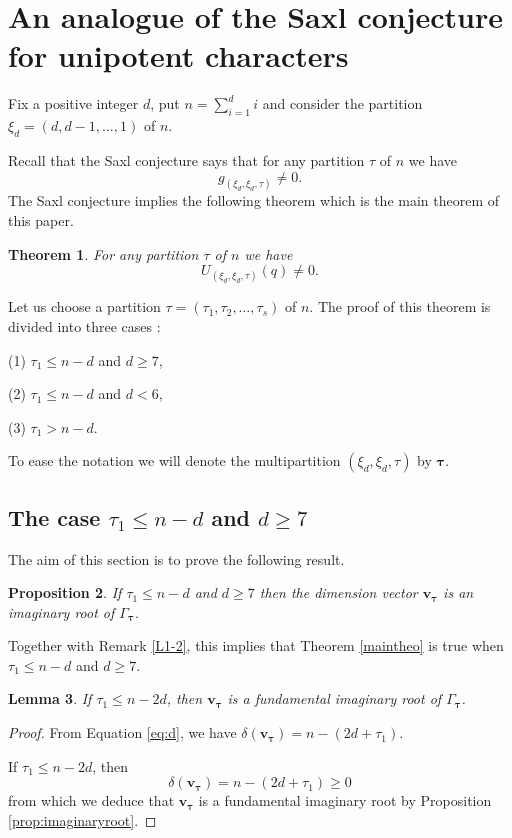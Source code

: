 \documentclass[11pt]{article}
\newtheorem{theo}{Theorem}[section]
\newtheorem{lemm}[theo]{Lemma}
\newtheorem{prop}[theo]{Proposition}
\theoremstyle{definition}
\numberwithin{equation}{section}
\newcommand{\bv}{{\mathbf{v}}}
\newcommand{\tauhat}{{\boldsymbol \tau}}
\begin{document}
\section{An analogue of the Saxl conjecture for unipotent characters}\label{s:mainthm}

Fix a positive integer $d$, put $n=\sum_{i=1}^d i$ and consider the partition  $\xi_d=(d,d-1, \ldots , 1)$ of $n$. 

Recall that the Saxl conjecture says that for any partition $\tau$ of $n$ we have
$$
g_{(\xi_d,\xi_d,\tau)}\neq 0.
$$
The Saxl conjecture implies the following theorem which is the main theorem of this paper.

\begin{theo}\label{thm:analoguesaxl}
	For any partition $\tau$ of $n$ we have  
	$$
	U_{(\xi_d,\xi_d,\tau)}(q)\neq  0.
	$$
	\label{maintheo}\end{theo}
Let us choose a partition $\tau=(\tau_1,\tau_2, \ldots, \tau_s)$ of $n$. The proof of this  theorem is divided into three cases : 

(1) $\tau_1\leq n-d$ and $d\geq 7$,

(2) $\tau_1 \leq n-d$ and $d<6$,

(3) $\tau_1>n-d$.



To ease the notation we will denote the multipartition $(\xi_d,\xi_d,\tau)$ by $\tauhat$.


\subsection{The case \texorpdfstring{$\tau_1\leq n-d$ and $d \geq 7$}{tau\_1 ≤ n-d and d ≥ 7}}


The aim of this section is to prove the following result.

\begin{prop} If $\tau_1\leq n-d$  and $d\geq 7$ then the dimension vector $\bv_\tauhat$ is an imaginary root of $\Gamma_\tauhat$.
	\label{theo1}\end{prop}

Together with Remark \ref{L1-2}, this implies that Theorem \ref{maintheo} is true when $\tau_1\leq n-d$ and $d\geq 7$.


\begin{lemm} If $\tau_1\leq n-2d$, then $\bv_\tauhat$ is a fundamental imaginary root of $\Gamma_\tauhat$.
\end{lemm}

\begin{proof}From Equation \eqref{eq:d}, we have $\delta(\bv_\tauhat)=n-(2d+\tau_1)$. 
	
	If $\tau_1\leq n-2d$, then 
	$$
	\delta(\bv_\tauhat)=n-(2d+\tau_1)\geq 0
	$$
	from which we deduce that $\bv_\tauhat$ is a fundamental imaginary root by Proposition \ref{prop:imaginaryroot}. 
\end{proof}
\end{document}
